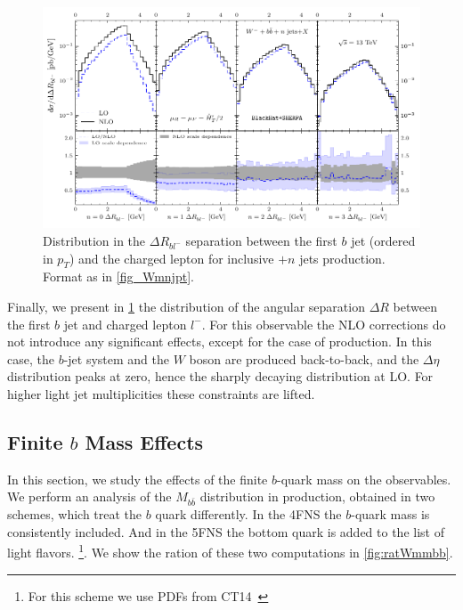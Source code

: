 \begin{figure}[ht]
  \centering
  \includegraphics[clip,scale=1.0]{plots/drbl.pdf}
  \caption{Distribution in the $\Delta R_{bl^-}$ separation between the first
  $b$ jet (ordered in $p_T$) and the charged lepton for inclusive \Wbbm$+n$ jets
  production.  Format as in \cref{fig_Wmnjpt}.}
  \label{fig_Wmnjdrbl}
\end{figure}

Finally, we present in \cref{fig_Wmnjdrbl} the distribution of the angular separation  $\Delta R$ between the first $b$ jet and charged lepton $l^-$.
For this observable the NLO corrections do not introduce any significant effects, except for the case of \Wbb{} production.
In this case, the $b$-jet system and the $W$ boson are produced back-to-back, and the $\Delta \eta$ distribution peaks at zero,
hence the sharply decaying distribution at LO.
For higher light jet multiplicities these constraints are lifted.


\subsection{Finite $b$ Mass Effects}
\label{sec:bmass}


In this section, we study the effects of the finite $b$-quark mass on the observables.
We perform an analysis of the $M_{b\bar{b}}$ distribution in \Wbbnj[1]{} production,
obtained in two schemes, which treat the $b$ quark differently. 
In the 4FNS the $b$-quark mass is consistently included. 
And in the 5FNS the bottom quark is added to the list of light flavors.%
\footnote{For this scheme we use PDFs from CT14~\cite{CT14}}.
We show the ration of these two computations in \cref{fig:ratWmmbb}.


